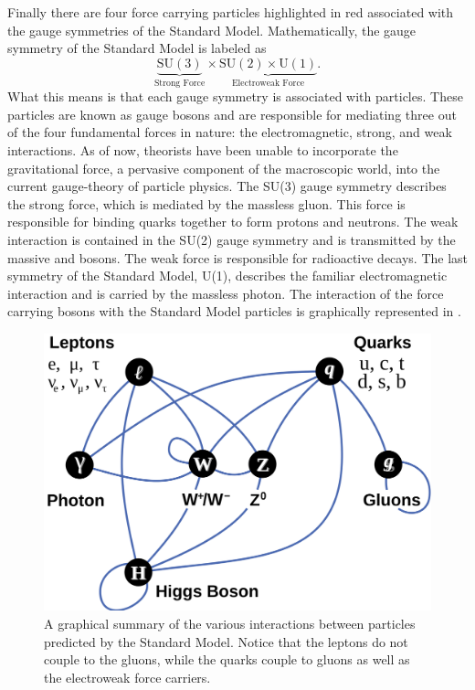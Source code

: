 Finally there are four force carrying particles highlighted in red associated
with the gauge symmetries of the Standard Model. Mathematically, the gauge 
symmetry of the Standard Model is labeled as 
\[
\underbrace{\text{SU}(3)}_{\text{Strong Force}} \times \underbrace{\text{SU}(2) \times \text{U}(1)}_{\text{Electroweak Force}}.
\]
What this means is that each gauge symmetry is associated with particles.
These particles are known as gauge bosons and are responsible for mediating three 
out of the four fundamental forces in nature: the electromagnetic, strong, and 
weak interactions. As of now, theorists have been unable to incorporate the 
gravitational force, a pervasive component of the macroscopic world,
into the current gauge-theory of particle physics.
The SU(3) gauge symmetry describes the strong force, which
is mediated by the massless gluon. This force is responsible for binding
quarks together to form protons and neutrons. The weak interaction is
contained in the SU(2) gauge symmetry and is transmitted by the massive \WBosons
and \ZBoson bosons. The weak force is responsible for radioactive decays. The
last symmetry of the Standard Model, U(1), describes the familiar electromagnetic
interaction and is carried by the massless photon. The interaction of the force
carrying bosons with the Standard Model particles is graphically represented in 
.

\begin{figure}[htbp]
    \centering
    \includegraphics[scale=0.1, angle=0]{./figures/Elementary_particle_interactions}
    \caption{A graphical summary of the various interactions between particles 
    predicted by the Standard Model. 
    Notice that the leptons do not couple to the gluons, while
    the quarks couple to gluons as well as the electroweak force carriers.}
    \label{fig:interactions}
\end{figure}

